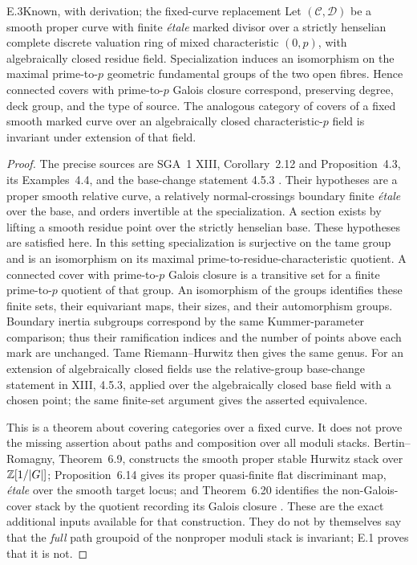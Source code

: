 \begin{claim}{E.3}{Known, with derivation; the fixed-curve replacement}
Let $(\mathcal C,\mathcal D)$ be a smooth proper curve with finite
\emph{\'etale} marked divisor over a strictly henselian complete
discrete valuation ring of mixed characteristic $(0,p)$, with
algebraically closed residue field. Specialization induces an
isomorphism on the maximal prime-to-$p$ geometric fundamental
groups of the two open fibres. Hence connected covers with
prime-to-$p$ Galois closure correspond, preserving degree, deck
group, and the type of source. The analogous category of covers
of a fixed smooth marked curve over an algebraically closed
characteristic-$p$ field is invariant under extension of that field.
\end{claim}
\begin{proof}
The precise sources are SGA~1 XIII, Corollary~2.12 and
Proposition~4.3, its Examples~4.4, and the base-change statement
4.5.3 \citep{E_SGA1}. Their hypotheses are a proper smooth
relative curve, a relatively normal-crossings boundary finite
\emph{\'etale} over the base, and orders invertible at the
specialization. A section exists by lifting a smooth residue point
over the strictly henselian base. These hypotheses are satisfied here. In this setting
specialization is surjective on the tame group and is an isomorphism
on its maximal prime-to-residue-characteristic quotient. A connected
cover with prime-to-$p$ Galois closure is a transitive set for a
finite prime-to-$p$ quotient of that group. An isomorphism of
the groups identifies these finite sets, their equivariant maps,
their sizes, and their automorphism groups. Boundary inertia
subgroups correspond by the same Kummer-parameter comparison;
thus their ramification indices and the number of points above
each mark are unchanged. Tame Riemann--Hurwitz then gives the same
genus. For an extension of algebraically closed fields use the
relative-group base-change statement in XIII, 4.5.3, applied over
the algebraically closed base field with a chosen point; the same
finite-set argument gives the asserted equivalence.

This is a theorem about covering categories over a fixed curve.
It does not prove the missing assertion about paths and composition
over all moduli stacks. Bertin--Romagny, Theorem~6.9, constructs
the smooth proper stable Hurwitz stack over $\mathbb Z[1/|G|]$;
Proposition~6.14 gives its proper quasi-finite flat discriminant
map, \emph{\'etale} over the smooth target locus; and Theorem~6.20
identifies the non-Galois-cover stack by the quotient recording
its Galois closure \citep{E_BR2007}. These are the exact additional
inputs available for that construction. They do not by themselves
say that the \emph{full} path groupoid of the nonproper moduli
stack is invariant; E.1 proves that it is not.
\end{proof}

